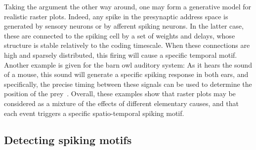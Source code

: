 \documentclass[runningheads]{llncs}
\begin{document}
Taking the argument the other way around, one may form a generative model for realistic raster plots. Indeed, any spike in the presynaptic address space is generated by sensory neurons or by afferent spiking neurons. In the latter case, these are connected to the spiking cell by a set of weights and delays, whose structure is stable relatively to the coding timescale. When these connections are high and sparsely distributed, this firing will cause a specific temporal motif. Another example is given for the barn owl auditory system: As it hears the sound of a mouse, this sound will generate a specific spiking response in both ears, and specifically, the precise timing between these signals can be used to determine the position of the prey~\cite{goodman_spike-timing-based_2010}. Overall, these examples show that raster plots may be considered as a mixture of the effects of different elementary causes, and that each event triggers a specific spatio-temporal spiking motif. 
%
\subsection{Detecting spiking motifs}
\end{document}
